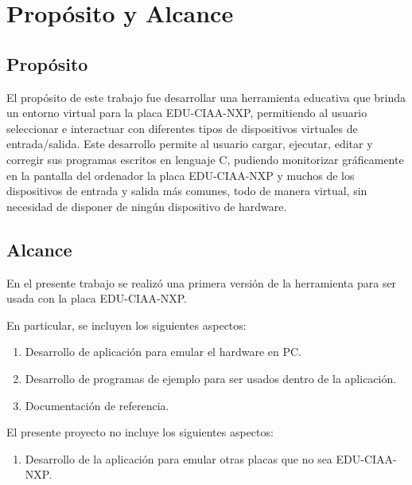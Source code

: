 
\section{Propósito y Alcance}

\subsection{Propósito}

El propósito de este trabajo fue desarrollar una herramienta educativa que brinda un entorno virtual para la placa EDU-CIAA-NXP, permitiendo al usuario seleccionar e interactuar con diferentes tipos de dispositivos virtuales de entrada/salida. Este desarrollo permite al usuario cargar,
ejecutar, editar y corregir sus programas escritos en lenguaje C, pudiendo monitorizar gráficamente en la pantalla del ordenador la placa EDU-CIAA-NXP y muchos de los dispositivos de entrada y salida más comunes, todo de manera virtual, sin necesidad de disponer de ningún dispositivo de hardware.

\subsection{Alcance}

En el presente trabajo se realizó una primera versión de la herramienta para ser usada con la placa EDU-CIAA-NXP.

En particular, se incluyen los siguientes aspectos:

\begin{enumerate}
	\item Desarrollo de aplicación para emular el hardware en PC.
	\item Desarrollo de programas de ejemplo para ser usados dentro de la aplicación.
	\item Documentación de referencia.
\end{enumerate}

El presente proyecto no incluye los siguientes aspectos:

\begin{enumerate}
	\item Desarrollo de la aplicación para emular otras placas que no sea EDU-CIAA-NXP.
\end{enumerate}